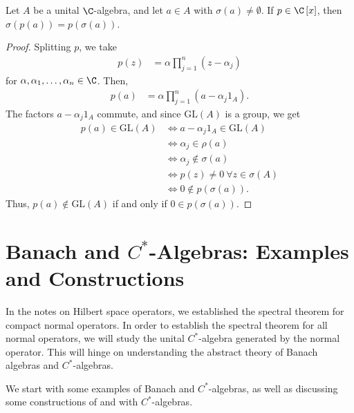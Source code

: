 \documentclass[10pt]{mypackage}
\newcommand{\GL}{\text{GL}}
\begin{document}
\begin{proposition}
  Let $A$ be a unital $\C$-algebra, and let $a\in A$ with $\sigma\left(a\right)\neq \emptyset$. If $p\in \C\left[x\right]$, then $\sigma\left(p(a)\right) = p\left(\sigma(a)\right)$.
\end{proposition}
\begin{proof}
  Splitting $p$, we take
  \begin{align*}
    p(z) &= \alpha \prod_{j=1}^{n}\left(z-\alpha_j\right)
  \end{align*}
  for $\alpha,\alpha_1,\dots,\alpha_n\in \C$. Then,
  \begin{align*}
    p\left(a\right) &= \alpha \prod_{j=1}^{n}\left(a-\alpha_j 1_{A}\right).
  \end{align*}
  The factors $a - \alpha_j1_A$ commute, and since $\GL(A)$ is a group, we get
  \begin{align*}
    p(a)\in \GL\left(A\right) &\Leftrightarrow a - \alpha_j1_A \in \GL\left(A\right)\\
                              &\Leftrightarrow \alpha_j\in \rho\left(a\right)\\
                              &\Leftrightarrow \alpha_j\notin \sigma\left(a\right)\\
                              &\Leftrightarrow p(z)\neq 0~\forall z\in \sigma\left(A\right)\\
                              &\Leftrightarrow 0\notin p\left(\sigma\left(a\right)\right).
  \end{align*}
  Thus, $p\left(a\right)\notin \GL\left(A\right)$ if and only if $0\in p\left(\sigma\left(a\right)\right)$.
\end{proof}

\section{Banach and $C^{\ast}$-Algebras: Examples and Constructions}%
In the notes on Hilbert space operators, we established the spectral theorem for compact normal operators. In order to establish the spectral theorem for all normal operators, we will study the unital $C^{\ast}$-algebra generated by the normal operator. This will hinge on understanding the abstract theory of Banach algebras and $C^{\ast}$-algebras.\newline

We start with some examples of Banach and $C^{\ast}$-algebras, as well as discussing some constructions of and with $C^{\ast}$-algebras.
\end{document}
